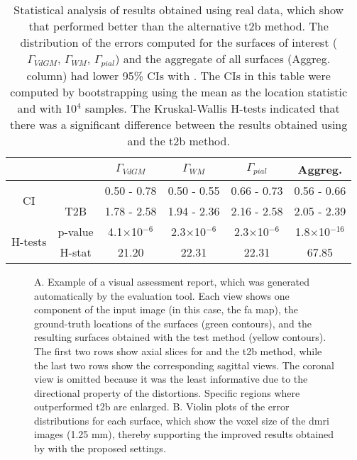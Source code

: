 \begin{table}
    \centering
    \footnotesize
    \tabcolsep=0.08cm
    \begin{tabular}{cccccc}
    & & $\Gamma_{VdGM}$  & $\Gamma_{WM}$ & $\Gamma_{pial}$ & Aggreg. \\
    \hline
    \multirow{2}{*}{CI}
       & \regseg{}        & 0.50 - 0.78 & 0.50 - 0.55 & 0.66 - 0.73 & 0.56 - 0.66 \\
       & T2B                  & 1.78 - 2.58 & 1.94 - 2.36 & 2.16 - 2.58 & 2.05 - 2.39 \\
    \hline
    \multirow{2}{*}{H-tests}
       & p-value  & 4.1$\times$10$^{-6}$& 2.3$\times$10$^{-6}$& 2.3$\times$10$^{-6}$ & 1.8$\times$10$^{-16}$ \\
       & H-stat   & 21.20               & 22.31               & 22.31                & 67.85              \\
    \hline
    \end{tabular}
    \caption{Statistical analysis of results obtained using real data, which show that \regseg{} performed better than
    the alternative \acrfull{t2b} method.
    The distribution of the errors computed for the surfaces of interest ($\Gamma_{VdGM}$, $\Gamma_{WM}$, $\Gamma_{pial}$)
      and the aggregate of all surfaces (Aggreg. column) had lower 95\% CIs with \regseg{}.
   The CIs in this table were computed by bootstrapping using the mean as the location statistic and with 10$^4$ samples.
    The Kruskal-Wallis H-tests indicated that there was a significant difference between the results obtained using \regseg{} and
      the \gls*{t2b} method.
    }\label{tab:results_real}
\end{table}

\begin{figure*}
  \centering
  
  \caption{A. Example of a visual assessment report, which was generated automatically by the evaluation tool.
    Each view shows one component of the input image (in this case, the \gls*{fa} map), the ground-truth locations
    of the surfaces (green contours), and the resulting surfaces obtained with the test method (yellow contours).
  The first two rows show axial slices for \regseg{} and the \acrfull*{t2b} method, while the last two rows
    show the corresponding sagittal views.
  The coronal view is omitted because it was the least informative due to the directional property
    of the distortions.
  Specific regions where \regseg{} outperformed \gls*{t2b} are enlarged.
  B. Violin plots of the error distributions for each surface, which show the voxel size of the \gls*{dmri} images
    (1.25 mm), thereby supporting the improved results obtained by \regseg{} with the proposed settings.
  }\label{fig:results_real}
\end{figure*}